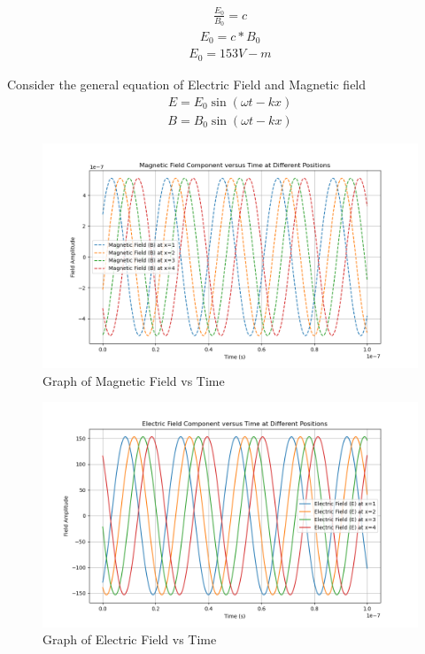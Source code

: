 \documentclass[journal,12pt,twocolumn]{IEEEtran}
\theoremstyle{remark}
\begin{document}
\solution
\fi
 \begin{align}\frac{E_0}{B_0}=c\end{align}
 \begin{align}
     E_0=c*B_0
 \end{align}
 \begin{align}E_0=153V-m\end{align}
 
Consider the general equation of Electric Field and Magnetic field
\begin{align}
    E=E_0\sin(\omega t-kx)
\end{align}
\begin{align}
    B=B_0\sin(\omega t-kx)
\end{align}
\begin{figure}[h]
    \centering
    \includegraphics[width=\linewidth]{ncert-physics/12/8/7/figs/analog1.png}
    \caption{Graph of Magnetic Field vs Time}
\end{figure}
\begin{figure}[h]
    \centering
    \includegraphics[width=\linewidth]{ncert-physics/12/8/7/figs/analog2.png}
    \caption{Graph of Electric Field vs Time}
\end{figure}
\end{document}
